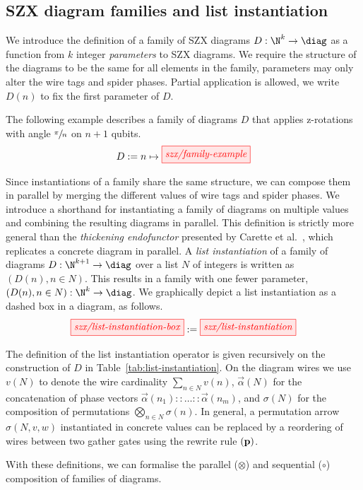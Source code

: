 \subsection{SZX diagram families and list instantiation}

We introduce the definition of a family of SZX diagrams $D: \N^k \to \diag$
as a function from $k$ integer \textit{parameters} to SZX diagrams.
We require the structure of the diagrams to be the same for all elements in the family,
parameters may only alter the wire tags and spider phases.
Partial application is allowed, we write $D(n)$ to fix the first parameter of $D$.

\begin{example}
    The following example describes a family of diagrams $D$ that applies z-rotations
    with angle $\sfrac{\pi}{n}$ on $n+1$ qubits.
    \[D := n \mapsto \tikzfig{szx/family-example}\]
\end{example}

Since instantiations of a family share the same structure,
we can compose them in parallel by merging the different values of wire tags and spider phases.
We introduce a shorthand for instantiating a family of diagrams on multiple values
and combining the resulting diagrams in parallel.
This definition is strictly more general than the \textit{thickening endofunctor}
presented by Carette et al.~\cite{carette_quantum_2021},
which replicates a concrete diagram in parallel.
A \textit{list instantiation} of a family of diagrams $D: \N^{k+1} \to \diag$ over
a list $N$ of integers is written as $(D(n), n \in N)$.
This results in a family with one fewer parameter, $(D(n), n \in N): \N^k \to \diag$. 
We graphically depict a list instantiation as a dashed box in a diagram, as follows.
\[\tikzfig{szx/list-instantiation-box} := \tikzfig{szx/list-instantiation}\]

The definition of the list instantiation operator is given recursively
on the construction of $D$ in Table~\ref{tab:list-instantiation}.
On the diagram wires we use $v(N)$ to denote the wire cardinality $\sum_{n \in N} v(n)$,
$\overrightarrow\alpha(N)$ for the concatenation of phase vectors
$\overrightarrow\alpha(n_1) :: \dots :: \overrightarrow\alpha(n_m)$,
and $\sigma(N)$ for the composition of permutations $\bigotimes_{n \in N} \sigma(n)$.
In general, a permutation arrow $\sigma(N,v,w)$ instantiated in concrete values
can be replaced by a reordering of wires between two gather gates
using the rewrite rule $\bf{(p)}$.

With these definitions, we can formalise the parallel ($\otimes$) and sequential ($\circ$) composition of families of diagrams.

